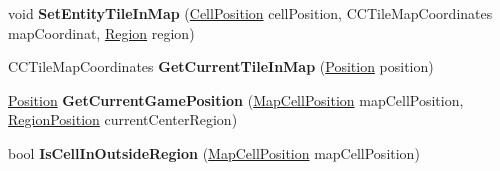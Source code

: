 \begin{DoxyCompactItemize}
\item 
\hypertarget{classClient_1_1Common_1_1Views_1_1RegionView_a8aec1eaa0a00f525330871970a1bdbe6}{void {\bfseries Set\-Entity\-Tile\-In\-Map} (\hyperlink{classCore_1_1Models_1_1CellPosition}{Cell\-Position} cell\-Position, C\-C\-Tile\-Map\-Coordinates map\-Coordinat, \hyperlink{classCore_1_1Models_1_1Region}{Region} region)}\label{classClient_1_1Common_1_1Views_1_1RegionView_a8aec1eaa0a00f525330871970a1bdbe6}

\item 
\hypertarget{classClient_1_1Common_1_1Views_1_1RegionView_a5df325cf6028ecee192ae99addccc23d}{C\-C\-Tile\-Map\-Coordinates {\bfseries Get\-Current\-Tile\-In\-Map} (\hyperlink{classCore_1_1Models_1_1Position}{Position} position)}\label{classClient_1_1Common_1_1Views_1_1RegionView_a5df325cf6028ecee192ae99addccc23d}

\item 
\hypertarget{classClient_1_1Common_1_1Views_1_1RegionView_ab68888d3e9c528931a225aa3136d72e3}{\hyperlink{classCore_1_1Models_1_1Position}{Position} {\bfseries Get\-Current\-Game\-Position} (\hyperlink{classClient_1_1Common_1_1Models_1_1MapCellPosition}{Map\-Cell\-Position} map\-Cell\-Position, \hyperlink{classCore_1_1Models_1_1RegionPosition}{Region\-Position} current\-Center\-Region)}\label{classClient_1_1Common_1_1Views_1_1RegionView_ab68888d3e9c528931a225aa3136d72e3}

\item 
\hypertarget{classClient_1_1Common_1_1Views_1_1RegionView_ad570d37692661fc145a4a8a6dcccd68e}{bool {\bfseries Is\-Cell\-In\-Outside\-Region} (\hyperlink{classClient_1_1Common_1_1Models_1_1MapCellPosition}{Map\-Cell\-Position} map\-Cell\-Position)}\label{classClient_1_1Common_1_1Views_1_1RegionView_ad570d37692661fc145a4a8a6dcccd68e}

\end{DoxyCompactItemize}
